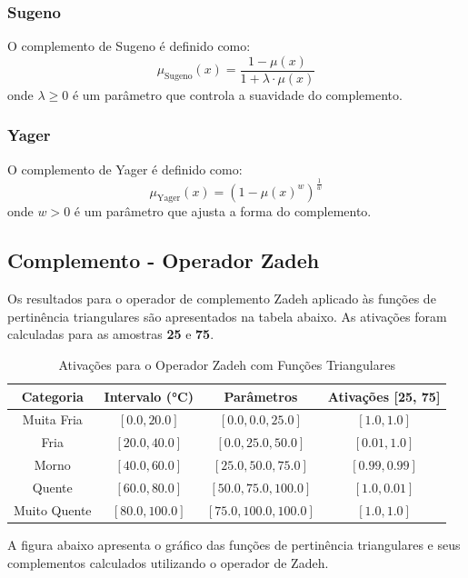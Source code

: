 \documentclass[a4paper,12pt]{article}
\begin{document}
\subsubsection{Sugeno}
O complemento de Sugeno é definido como:
\[
\mu_{\text{Sugeno}}(x) = \frac{1 - \mu(x)}{1 + \lambda \cdot \mu(x)}
\]
onde $\lambda \geq 0$ é um parâmetro que controla a suavidade do complemento.

\subsubsection{Yager}
O complemento de Yager é definido como:
\[
\mu_{\text{Yager}}(x) = \left(1 - \mu(x)^w\right)^{\frac{1}{w}}
\]
onde $w > 0$ é um parâmetro que ajusta a forma do complemento.

\subsection{Complemento - Operador Zadeh}

Os resultados para o operador de complemento Zadeh aplicado às funções de pertinência triangulares são apresentados na tabela abaixo. As ativações foram calculadas para as amostras \textbf{25} e \textbf{75}.

\begin{table}[H]
\centering
\caption{Ativações para o Operador Zadeh com Funções Triangulares}
\begin{tabular}{|c|c|c|c|}
\hline
\textbf{Categoria}    & \textbf{Intervalo (°C)} & \textbf{Parâmetros}       & \textbf{Ativações [25, 75]} \\ \hline
Muita Fria            & $[0.0, 20.0]$          & $[0.0, 0.0, 25.0]$        & $[1.0, 1.0]$               \\ \hline
Fria                  & $[20.0, 40.0]$         & $[0.0, 25.0, 50.0]$       & $[0.01, 1.0]$              \\ \hline
Morno                 & $[40.0, 60.0]$         & $[25.0, 50.0, 75.0]$      & $[0.99, 0.99]$             \\ \hline
Quente                & $[60.0, 80.0]$         & $[50.0, 75.0, 100.0]$     & $[1.0, 0.01]$              \\ \hline
Muito Quente          & $[80.0, 100.0]$        & $[75.0, 100.0, 100.0]$    & $[1.0, 1.0]$               \\ \hline
\end{tabular}
\end{table}

A figura abaixo apresenta o gráfico das funções de pertinência triangulares e seus complementos calculados utilizando o operador de Zadeh.
\end{document}
